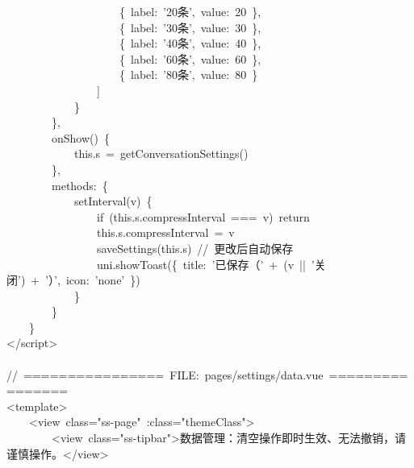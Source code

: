\documentclass[a4paper,10pt]{article}
\begin{document}
{~~~~~~~~~~~~~~~~~~~~\{~label:~'20条',~value:~20~\},\\
~~~~~~~~~~~~~~~~~~~~\{~label:~'30条',~value:~30~\},\\
~~~~~~~~~~~~~~~~~~~~\{~label:~'40条',~value:~40~\},\\
~~~~~~~~~~~~~~~~~~~~\{~label:~'60条',~value:~60~\},\\
~~~~~~~~~~~~~~~~~~~~\{~label:~'80条',~value:~80~\}\\
~~~~~~~~~~~~~~~~]\\
~~~~~~~~~~~~\}\\
~~~~~~~~\},\\
~~~~~~~~onShow()~\{\\
~~~~~~~~~~~~this.s~=~getConversationSettings()\\
~~~~~~~~\},\\
~~~~~~~~methods:~\{\\
~~~~~~~~~~~~setInterval(v)~\{\\
~~~~~~~~~~~~~~~~if~(this.s.compressInterval~===~v)~return\\
~~~~~~~~~~~~~~~~this.s.compressInterval~=~v\\
~~~~~~~~~~~~~~~~saveSettings(this.s)~//~更改后自动保存\\
~~~~~~~~~~~~~~~~uni.showToast(\{~title:~'已保存（'~+~(v~||~'关闭')~+~'）',~icon:~'none'~\})\\
~~~~~~~~~~~~\}\\
~~~~~~~~\}\\
~~~~\}\\
</script>\\
\mbox{}\\
//~================~FILE:~pages/settings/data.vue~================\\
<template>\\
~~~~<view~class="ss-page"~:class="themeClass">\\
~~~~~~~~<view~class="ss-tipbar">数据管理：清空操作即时生效、无法撤销，请谨慎操作。</view>
}

\newpage
\end{document}

